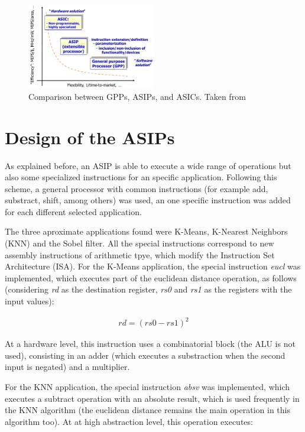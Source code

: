 \documentclass[conference]{IEEEtran}
\begin{document}
\begin{figure}
\begin{center}
 \includegraphics[width=0.5\textwidth]{GPP-ASIP-ASIC}
 \caption{Comparison between GPPs, ASIPs, and ASICs. Taken from \cite{henkel2006design}} \label{fig:gaa}
 \end{center}
\end{figure}




\section{Design of the ASIPs}


As explained before, an ASIP is able to execute a wide range of operations but also some specialized instructions
for an specific application. Following this scheme, a general processor with common instructions (for example add,
substract, shift, among others) was used, an one specific instruction was added for each different selected application.

The three aproximate applications found were K-Means, K-Nearest Neighbors (KNN) and the Sobel filter. 
All the special instructions correspond to new assembly instructions of arithmetic tpye, which modify the Instruction Set Architecture (ISA). For the K-Means
application, the special instruction \emph{eucl} was implemented, which executes part of the euclidean distance operation,
as follows (considering \emph{rd} as the destination register, \emph{rs0} and \emph{rs1} as the registers with the input values):

\begin{align}
 rd = (rs0 - rs1)^2
\end{align}

At a hardware level, this instruction uses a combinatorial block (the ALU is not used), consisting in an adder (which executes a substraction when the second input
is negated) and a multiplier.

For the KNN application, the special instruction \emph{absv} was implemented, which executes a subtract operation with an absolute result, 
which is used frequently in the KNN algorithm (the euclidean distance remains the main operation in this algorithm too). At at high abstraction level,
this operation executes:
\end{document}
